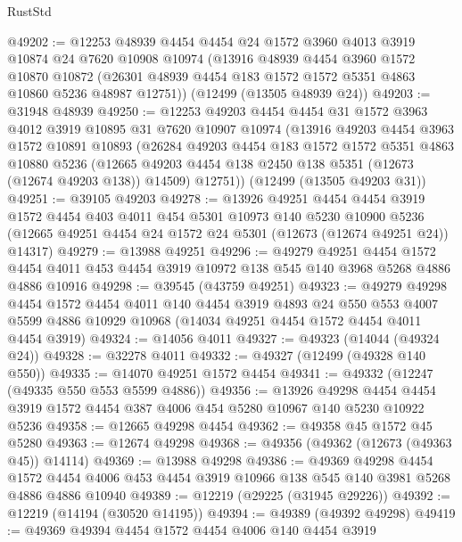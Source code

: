 \begin{lexlean}{RustStd}
\begin{coremodule}
@49202 := @12253
    @48939
    @4454
    @4454
    @24
    @1572
    @3960
    @4013
    @3919
    @10874
    @24
    @7620
    @10908
    @10974
    (@13916
      @48939
      @4454
      @3960
      @1572
      @10870
      @10872
      (@26301 @48939 @4454 @183 @1572 @1572 @5351 @4863 @10860 @5236 @48987 @12751))
    (@12499 (@13505 @48939 @24))
@49203 := @31948 @48939
@49250 := @12253
    @49203
    @4454
    @4454
    @31
    @1572
    @3963
    @4012
    @3919
    @10895
    @31
    @7620
    @10907
    @10974
    (@13916
      @49203
      @4454
      @3963
      @1572
      @10891
      @10893
      (@26284
        @49203
        @4454
        @183
        @1572
        @1572
        @5351
        @4863
        @10880
        @5236
        (@12665 @49203 @4454 @138 @2450 @138 @5351 (@12673 (@12674 @49203 @138)) @14509)
        @12751))
    (@12499 (@13505 @49203 @31))
@49251 := @39105 @49203
@49278 := @13926
    @49251
    @4454
    @4454
    @3919
    @1572
    @4454
    @403
    @4011
    @454
    @5301
    @10973
    @140
    @5230
    @10900
    @5236
    (@12665 @49251 @4454 @24 @1572 @24 @5301 (@12673 (@12674 @49251 @24)) @14317)
@49279 := @13988 @49251
@49296 := @49279
    @49251
    @4454
    @1572
    @4454
    @4011
    @453
    @4454
    @3919
    @10972
    @138
    @545
    @140
    @3968
    @5268
    @4886
    @4886
    @10916
@49298 := @39545 (@43759 @49251)
@49323 := @49279
    @49298
    @4454
    @1572
    @4454
    @4011
    @140
    @4454
    @3919
    @4893
    @24
    @550
    @553
    @4007
    @5599
    @4886
    @10929
    @10968
    (@14034 @49251 @4454 @1572 @4454 @4011 @4454 @3919)
@49324 := @14056 @4011
@49327 := @49323 (@14044 (@49324 @24))
@49328 := @32278 @4011
@49332 := @49327 (@12499 (@49328 @140 @550))
@49335 := @14070 @49251 @1572 @4454
@49341 := @49332 (@12247 (@49335 @550 @553 @5599 @4886))
@49356 := @13926
    @49298
    @4454
    @4454
    @3919
    @1572
    @4454
    @387
    @4006
    @454
    @5280
    @10967
    @140
    @5230
    @10922
    @5236
@49358 := @12665 @49298 @4454
@49362 := @49358 @45 @1572 @45 @5280
@49363 := @12674 @49298
@49368 := @49356 (@49362 (@12673 (@49363 @45)) @14114)
@49369 := @13988 @49298
@49386 := @49369
    @49298
    @4454
    @1572
    @4454
    @4006
    @453
    @4454
    @3919
    @10966
    @138
    @545
    @140
    @3981
    @5268
    @4886
    @4886
    @10940
@49389 := @12219 (@29225 (@31945 @29226))
@49392 := @12219 (@14194 (@30520 @14195))
@49394 := @49389 (@49392 @49298)
@49419 := @49369
    @49394
    @4454
    @1572
    @4454
    @4006
    @140
    @4454
    @3919

\end{coremodule}
\end{lexlean}
